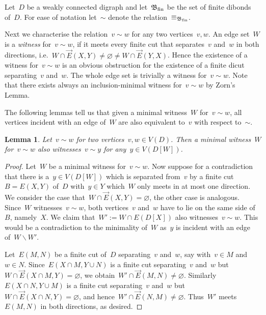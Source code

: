 \documentclass[reqno, 12pt]{amsart}
\numberwithin{equation}{section}
\numberwithin{figure}{section}
\let\emptyset=\varnothing
\let\setminus=\smallsetminus
\theoremstyle{plain}
\newtheorem{lemma}[thm]{Lemma}
\theoremstyle{definition}
\begin{document}
Let~$D$ be a weakly connected digraph 
and let~$\mathfrak{B}_\textnormal{fin}$ be the set of finite dibonds of~$D$. 
For ease of notation let~$\sim$ denote the relation~${\equiv_{\mathfrak{B}_\textnormal{fin}}}$.

Next we characterise the relation~${v \sim w}$ for any two vertices~${v, w}$. 
An edge set~$W$ is a \emph{witness} for~${v \sim w}$, if it meets every finite cut that separates~$v$ and~$w$ in both directions, i.e.~${W \cap \overrightarrow{E}(X,Y) \neq \emptyset \neq W \cap \overrightarrow{E}(Y,X)}$. 
Hence the existence of a witness for~${v \sim w}$ is an obvious obstruction for the existence of a finite dicut separating~$v$ and~$w$. 
The whole edge set is trivially a witness for~${v \sim w}$. 
Note that there exists always an inclusion-minimal witness for~${v \sim w}$ by Zorn's Lemma. 



The following lemmas tell us that given a minimal witness~$W$ for~${v \sim w}$, all vertices incident with an edge of~$W$ are also equivalent to~$v$ with respect to~$\sim$.

\begin{lemma}
    \label{lem:common-witness}
    Let~${v \sim w}$ for two vertices~${v, w \in V(D)}$.
    Then a minimal witness~$W$ for~${v \sim w}$ also witnesses~${v \sim y}$ for any~${y \in V(D[W])}$.
\end{lemma}



\begin{proof}
    Let~$W$ be a minimal witness for~${v \sim w}$.
    Now suppose for a contradiction that there is a~${y \in V(D[W])}$ which is separated from~$v$ by a finite cut~${B = E(X, Y)}$ of~$D$ with~${y \in Y}$ which~$W$ only meets in at most one direction. 
    We consider the case that~${W \cap \overrightarrow{E}(X,Y) = \emptyset}$, the other case is analogous. 
    Since~$W$ witnesses~${v \sim w}$, both vertices~$v$ and~$w$ have to lie on the same side of~$B$, namely~$X$. 
    We claim that~${W' := W \cap E(D[X])}$ also witnesses~${v \sim w}$. 
    This would be a contradiction to the minimality of~$W$ as~$y$ is incident with an edge of~${W \setminus W'}$. 
    
    Let~${E(M, N)}$ be a finite cut of~$D$ separating~$v$ and~$w$, say with~${v \in M}$ and~${w \in N}$. 
    Since~${E(X \cap M, Y \cup N)}$ is a finite cut separating~$v$ and~$w$ but~${W \cap \overrightarrow{E}(X \cap M, Y) = \emptyset}$, we obtain~${W' \cap \overrightarrow{E}(M, N) \neq \emptyset}$. 
    Similarly~${E(X \cap N, Y \cup M)}$ is a finite cut separating~$v$ and~$w$ but~${W \cap \overrightarrow{E}(X \cap N, Y) = \emptyset}$, and hence~${W' \cap \overrightarrow{E}(N, M) \neq \emptyset}$. 
    Thus~$W'$ meets~$E(M,N)$ in both directions, as desired. 
\end{proof}
\end{document}
